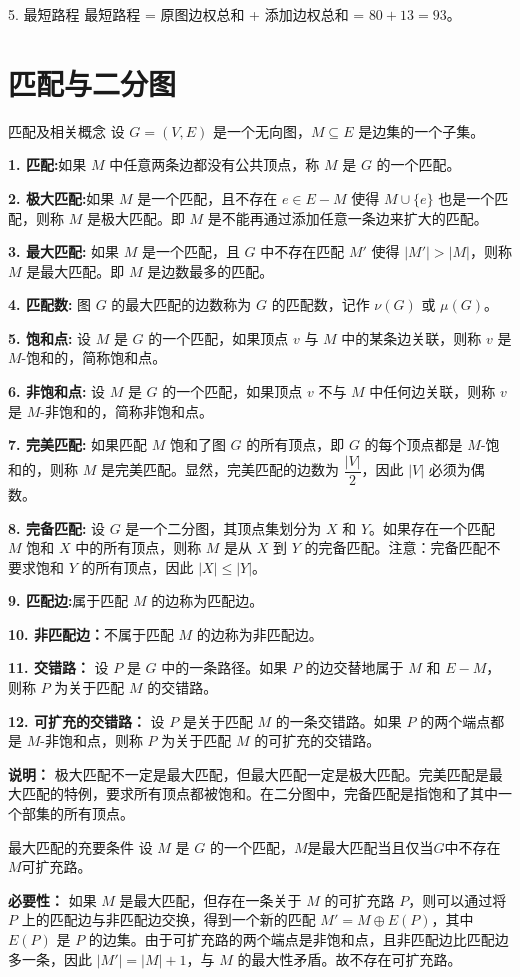 5. 最短路程
最短路程 = 原图边权总和 + 添加边权总和 = $80 + 13 = 93$。
\newpage
\section{匹配与二分图}
\begin{definition}{匹配及相关概念}{}
设 $G=(V,E)$ 是一个无向图，$M \subseteq E$ 是边集的一个子集。

\textbf{1. 匹配:}如果 $M$ 中任意两条边都没有公共顶点，称 $M$ 是 $G$ 的一个匹配。

\textbf{2. 极大匹配:}如果 $M$ 是一个匹配，且不存在 $e \in E- M$ 使得 $M \cup \{e\}$ 也是一个匹配，则称 $M$ 是极大匹配。即 $M$ 是不能再通过添加任意一条边来扩大的匹配。

\textbf{3. 最大匹配:}
如果 $M$ 是一个匹配，且 $G$ 中不存在匹配 $M'$ 使得 $|M'| > |M|$，则称 $M$ 是最大匹配。即 $M$ 是边数最多的匹配。

\textbf{4. 匹配数:}
图 $G$ 的最大匹配的边数称为 $G$ 的匹配数，记作 $\nu(G)$ 或 $\mu(G)$。

\textbf{5. 饱和点:}
设 $M$ 是 $G$ 的一个匹配，如果顶点 $v$ 与 $M$ 中的某条边关联，则称 $v$ 是 $M$-饱和的，简称饱和点。

\textbf{6. 非饱和点:}
设 $M$ 是 $G$ 的一个匹配，如果顶点 $v$ 不与 $M$ 中任何边关联，则称 $v$ 是 $M$-非饱和的，简称非饱和点。

\textbf{7. 完美匹配:}
如果匹配 $M$ 饱和了图 $G$ 的所有顶点，即 $G$ 的每个顶点都是 $M$-饱和的，则称 $M$ 是完美匹配。显然，完美匹配的边数为 $\dfrac{|V|}2$，因此 $|V|$ 必须为偶数。

\textbf{8. 完备匹配:}
设 $G$ 是一个二分图，其顶点集划分为 $X$ 和 $Y$。如果存在一个匹配 $M$ 饱和 $X$ 中的所有顶点，则称 $M$ 是从 $X$ 到 $Y$ 的完备匹配。注意：完备匹配不要求饱和 $Y$ 的所有顶点，因此 $|X| \leqslant |Y|$。

\textbf{9. 匹配边:}属于匹配 $M$ 的边称为匹配边。

\textbf{10. 非匹配边：}不属于匹配 $M$ 的边称为非匹配边。

\textbf{11. 交错路：}
设 $P$ 是 $G$ 中的一条路径。如果 $P$ 的边交替地属于 $M$ 和 $E- M$，则称 $P$ 为关于匹配 $M$ 的交错路。

\textbf{12. 可扩充的交错路：}
设 $P$ 是关于匹配 $M$ 的一条交错路。如果 $P$ 的两个端点都是 $M$-非饱和点，则称 $P$ 为关于匹配 $M$ 的可扩充的交错路。
\end{definition}
\textbf{说明：}
极大匹配不一定是最大匹配，但最大匹配一定是极大匹配。完美匹配是最大匹配的特例，要求所有顶点都被饱和。在二分图中，完备匹配是指饱和了其中一个部集的所有顶点。
\begin{theorem}{最大匹配的充要条件}{}
    设 $M$ 是 $G$ 的一个匹配，$M$是最大匹配当且仅当$G$中不存在$M$可扩充路。
\end{theorem}
 \textbf{必要性：} 如果 $M$ 是最大匹配，但存在一条关于 $M$ 的可扩充路 $P$，则可以通过将 $P$ 上的匹配边与非匹配边交换，得到一个新的匹配 $M' = M \oplus E(P)$，其中 $E(P)$ 是 $P$ 的边集。由于可扩充路的两个端点是非饱和点，且非匹配边比匹配边多一条，因此 $|M'| = |M| + 1$，与 $M$ 的最大性矛盾。故不存在可扩充路。

